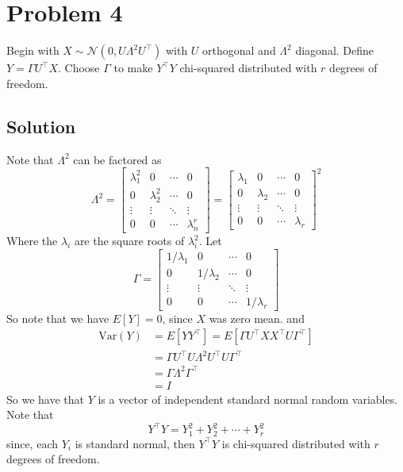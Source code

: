 \documentclass[a4paper]{article}
\begin{document}
\section*{Problem 4}%
Begin with $X \sim \mathcal{N}(0, U\Lambda^2 U^\top)$ with $U$ orthogonal and $\Lambda^2$ diagonal. Define $Y = \Gamma U^\top X$. Choose $\Gamma$ to make $Y^\top Y$ chi-squared distributed with $r$ degrees of freedom.

\subsection*{Solution}%
Note that $\Lambda^2$ can be factored as
\[
  \Lambda^2 = 
  \begin{bmatrix}
    \lambda_1^2 & 0 & \cdots & 0 \\
    0 & \lambda_2^2 &\cdots & 0 \\
    \vdots & \vdots & \ddots & \vdots \\
    0 & 0 & \cdots & \lambda_n^r
  \end{bmatrix}
  =
  \begin{bmatrix}
    \lambda_1 & 0 & \cdots & 0 \\
    0 & \lambda_2 &\cdots & 0 \\
    \vdots & \vdots & \ddots & \vdots \\
    0 & 0 & \cdots & \lambda_r
  \end{bmatrix}^2
\]
Where the $\lambda_i$ are the square roots of $\lambda_i^2$. Let 
\[
  \Gamma = 
  \begin{bmatrix}
    1/\lambda_1 & 0 & \cdots & 0 \\
    0 & 1/\lambda_2 &\cdots & 0 \\
    \vdots & \vdots & \ddots & \vdots \\
    0 & 0 & \cdots & 1/\lambda_r
  \end{bmatrix}
\]
So note that we have $E[Y] = 0$, since $X$ was zero mean. and 
\[
  \begin{aligned}
    \text{Var}(Y) &= E[YY^\top] = E[\Gamma U^\top XX^\top U \Gamma^\top] \\
                  &= \Gamma U^\top U \Lambda^2 U^\top U \Gamma^\top \\
                  &= \Gamma \Lambda^2 \Gamma^\top \\
                  &= I
  \end{aligned}
\]
So we have that $Y$ is a vector of independent standard normal random variables. Note that
\[
Y^\top Y = Y_1^2 + Y_2^2 + \cdots + Y_r^2
\]
since, each $Y_i$ is standard normal, then $Y^\top Y$ is chi-squared distributed with $r$ degrees of freedom.
\end{document}
